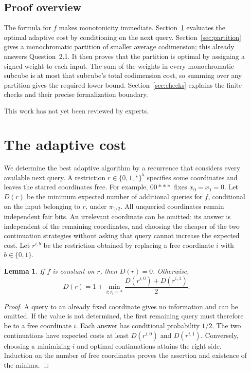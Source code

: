 \documentclass[11pt]{article}
\newtheorem{lemma}[theorem]{Lemma}
\begin{document}
\subsection*{Proof overview}
The formula for $f$ makes monotonicity immediate. Section~\ref{sec:alg}
evaluates the optimal adaptive cost by conditioning on the next query.
Section~\ref{sec:partition} gives a monochromatic partition of smaller
average codimension; this already answers Question~2.1. It then proves
that the partition is optimal by assigning a signed weight to each input.
The sum of the weights in every monochromatic subcube is at most that
subcube's total codimension cost, so summing over any partition gives the
required lower bound. Section~\ref{sec:checks} explains the finite checks
and their precise formalization boundary.

This work has not yet been reviewed by experts.

\section{The adaptive cost}\label{sec:alg}
We determine the best adaptive algorithm by a recurrence that considers
every available next query. A restriction $r\in\{0,1,*\}^5$ specifies
some coordinates and leaves the starred coordinates free. For example,
$00***$ fixes $x_0=x_1=0$. Let $D(r)$ be the minimum expected number of
additional queries for $f$, conditional on the input belonging to $r$,
under $\pi_{1/2}$. All unqueried coordinates remain independent fair bits.
An irrelevant coordinate can be omitted: its answer is independent of the
remaining coordinates, and choosing the cheaper of the two continuation
strategies without asking that query cannot increase the expected cost.
Let $r^{i,b}$ be the restriction obtained by replacing a free coordinate
$i$ with $b\in\{0,1\}$.

\begin{lemma}\label{lem:recurrence}
If $f$ is constant on $r$, then $D(r)=0$. Otherwise,
\begin{equation}\label{eq:recurrence}
 D(r)=1+\min_{i:r_i=*}
       \frac{D(r^{i,0})+D(r^{i,1})}{2}.
\end{equation}
\end{lemma}
\begin{proof}
A query to an already fixed coordinate gives no information and can be
omitted. If the value is not determined, the first remaining query must
therefore be to a free coordinate $i$. Each answer has conditional
probability $1/2$. The two continuations have expected costs at least
$D(r^{i,0})$ and $D(r^{i,1})$. Conversely, choosing a minimizing $i$ and
optimal continuations attains the right side. Induction on the number of
free coordinates proves the assertion and existence of the minima.
\end{proof}
\end{document}
